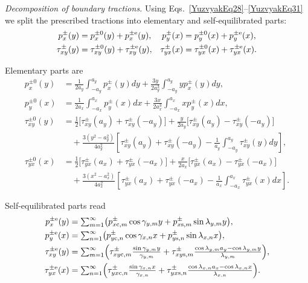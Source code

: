 \emph{Decomposition of boundary tractions.}
Using Eqs.~\eqref{YuzvyakEq28}–\eqref{YuzvyakEq31} we split the prescribed
tractions into elementary and self-equilibrated parts:
\begin{align}
	p_{x}^{\pm}(y)&=p_{x}^{\pm0}(y)+p_{x}^{\pm\mathrm e}(y), &
	p_{y}^{\pm}(x)&=p_{y}^{\pm0}(x)+p_{y}^{\pm\mathrm e}(x),\notag\\
	\tau_{xy}^{\pm}(y)&=\tau_{xy}^{\pm0}(y)+\tau_{xy}^{\pm\mathrm e}(y), &
	\tau_{yx}^{\pm}(x)&=\tau_{yx}^{\pm0}(x)+\tau_{yx}^{\pm\mathrm e}(x).
	\label{YuzvyakEq32}
\end{align}

\noindent
Elementary parts are
\begin{equation}
	\begin{array}{ll}
		p_x^{\pm0}(y)
		&= \frac{1}{2a_y}\int_{-a_y}^{a_y}p_x^\pm(y) dy
		+ \frac{3y}{2a_y^3}\int_{-a_y}^{a_y}y p_x^\pm(y) dy,
		\\[8pt]
		p_y^{\pm0}(x)
		&= \frac{1}{2a_x}\int_{-a_x}^{a_x}p_y^\pm(x) dx
		+ \frac{3x}{2a_x^3}\int_{-a_x}^{a_x}x p_y^\pm(x) dx,
		\\[8pt]
		\tau_{xy}^{\pm0}(y)
		&= \frac{1}{2}\big[\tau_{xy}^{\pm}(a_y)+\tau_{xy}^{\pm}(-a_y)\big]
		+ \frac{y}{2a_y}\bigl[\tau_{xy}^{\pm}(a_y)-\tau_{xy}^{\pm}(-a_y)\bigr]
		\\
		&\quad+ \frac{3 (y^2-a_y^2)}{4a_y^2}\left[
		\tau_{xy}^{\pm}(a_y)+\tau_{xy}^{\pm}(-a_y)
		-\frac{1}{a_y}\int_{-a_y}^{a_y}\tau_{xy}^{\pm}(y) dy
		\right],
		\\[8pt]
		\tau_{yx}^{\pm0}(x)
		&= \frac{1}{2}\big[\tau_{yx}^{\pm}(a_x)+\tau_{yx}^{\pm}(-a_x)\big]
		 + \frac{x}{2a_x}\bigl[\tau_{yx}^{\pm}(a_x)-\tau_{yx}^{\pm}(-a_x)\bigr]
		\\
		&\quad+ \frac{3 (x^2-a_x^2)}{4a_x^2}\left[
		\tau_{yx}^{\pm}(a_x)+\tau_{yx}^{\pm}(-a_x)
		-\frac{1}{a_x}\int_{-a_x}^{a_x}\tau_{yx}^{\pm}(x) dx
		\right].
	\end{array}
	\label{YuzvyakEq32a}
\end{equation}

\noindent
Self-equilibrated parts read
\begin{equation}\label{YuzvyakEq32b}
	\begin{aligned}
		p_{x}^{\pm\mathrm e}(y)&=
		{\textstyle\sum_{m=1}^{\infty}}
		\bigl(p_{x\mathrm c,m}^{\pm}\cos\gamma_{y,m}y
		+p_{x\mathrm s,m}^{\pm}\sin\lambda_{y,m}y\bigr),
		\\
		p_{y}^{\pm\mathrm e}(x)&=
		{\textstyle\sum_{n=1}^{\infty}}
		\bigl(p_{y\mathrm c,n}^{\pm}\cos\gamma_{x,n}x
		+p_{y\mathrm s,n}^{\pm}\sin\lambda_{x,n}x\bigr),
		\\
		\tau_{xy}^{\pm\mathrm e}(y)&=
		{\textstyle\sum_{m=1}^{\infty}}
		\Bigl(
		\tau_{xy\mathrm c,m}^{\pm}\tfrac{\sin\gamma_{y,m}y}{\gamma_{y,m}}
		+\tau_{xy\mathrm s,m}^{\pm}
		\tfrac{\cos\lambda_{y,m}a_{y}-\cos\lambda_{y,m}y}{\lambda_{y,m}}
		\Bigr),
		\\
		\tau_{yx}^{\pm\mathrm e}(x)&=
		{\textstyle\sum_{n=1}^{\infty}}
		\Bigl(
		\tau_{yx\mathrm c,n}^{\pm}\tfrac{\sin\gamma_{x,n}x}{\gamma_{x,n}}
		+\tau_{yx\mathrm s,n}^{\pm}
		\tfrac{\cos\lambda_{x,n}a_{x}-\cos\lambda_{x,n}x}{\lambda_{x,n}}
		\Bigr).
	\end{aligned}
\end{equation}

